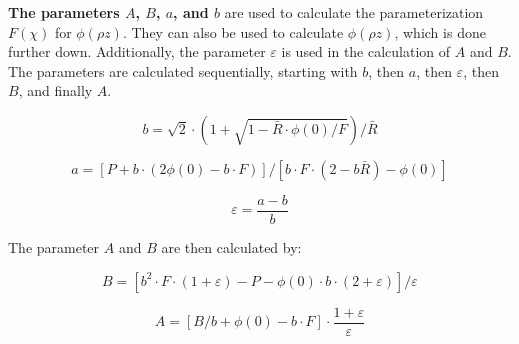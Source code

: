 






\textbf{The parameters $A$, $B$, $a$, and $b$} are used to calculate the parameterization $F(\chi)$ for $\phi(\rho z)$.
They can also be used to calculate $\phi(\rho z)$, which is done further down.
Additionally, the parameter $\varepsilon$ is used in the calculation of $A$ and $B$.
The parameters are calculated sequentially, starting with $b$, then $a$, then $\varepsilon$, then $B$, and finally $A$.


\begin{equation}
    \label{eq:theory:quantitative:pap:small_b}
    b = \sqrt{2} \cdot (1 + \sqrt{1 - \bar{R} \cdot \phi(0) / F})/\bar{R}
\end{equation}

\begin{equation}
    \label{eq:theory:quantitative:pap:small_a}
    a = [P + b \cdot (2\phi(0) - b \cdot F)] / [b \cdot F \cdot (2 - b \bar{R}) - \phi(0)]
\end{equation}

\begin{equation}
    \label{eq:theory:quantitative:pap:epsilon}
    \varepsilon = \frac{a-b}{b}
\end{equation}



The parameter $A$ and $B$ are then calculated by:

\begin{equation}
    \label{eq:theory:quantitative:pap:big_B}
    B = [b^2 \cdot F \cdot (1 + \varepsilon) - P - \phi(0) \cdot b \cdot (2+\varepsilon) ] / \varepsilon
\end{equation}

\begin{equation}
    \label{eq:theory:quantitative:pap:big_A}
    A = [B/b + \phi(0) - b \cdot F] \cdot \frac{1+ \varepsilon}{\varepsilon}
\end{equation}



